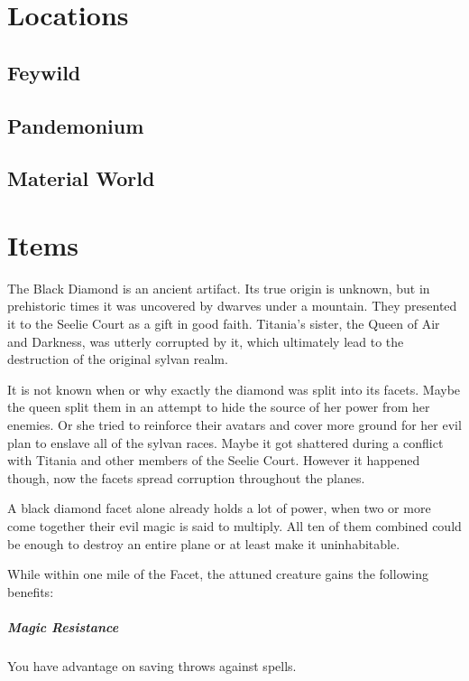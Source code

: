 \documentclass[letter,10pt,twocolumn,openany]{dndbook}
\begin{document}
\chapter{Locations}

\section{Feywild}
\section{Pandemonium}
\section{Material World}

\chapter{Items}


The Black Diamond is an ancient artifact.
Its true origin is unknown, but in prehistoric times it was uncovered by dwarves under a mountain.
They presented it to the Seelie Court as a gift in good faith.
Titania's sister, the Queen of Air and Darkness, was utterly corrupted by it,
which ultimately lead to the destruction of the original sylvan realm.

It is not known when or why exactly the diamond was split into its facets.
Maybe the queen split them in an attempt to hide the source of her power from her enemies.
Or she tried to reinforce their avatars and cover more ground for her evil plan to enslave all of the sylvan races.
Maybe it got shattered during a conflict with Titania and other members of the Seelie Court.
However it happened though, now the facets spread corruption throughout the planes.

A black diamond facet alone already holds a lot of power,
when two or more come together their evil magic is said to multiply.
All ten of them combined could be enough to destroy an entire plane or at least make it uninhabitable.

While within one mile of the Facet, the attuned creature gains the following benefits:

\paragraph{Magic Resistance}
You have advantage on saving throws against spells.
\end{document}
